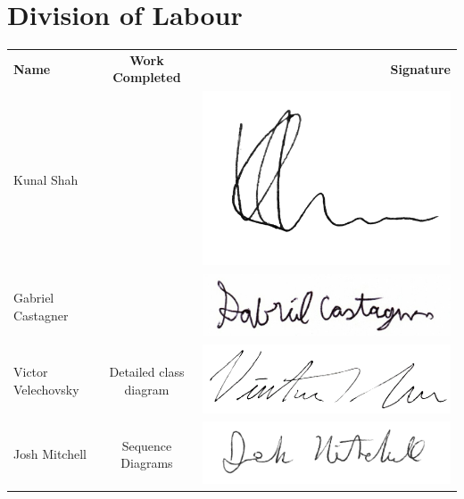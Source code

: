 \documentclass[]{article}
\begin{document}
\section{Division of Labour}
\label{sec:division_of_labour}
\begin{tabular}{l c r}
	\textbf{Name} & \textbf{Work Completed} & \textbf{Signature} \\
	
	Kunal Shah &  & 
	\includegraphics[scale=0.2]{../Resources/Signature/Kunal-Sig.png} \\
	
	Gabriel Castagner &  &
	\includegraphics[scale=0.2]{../Resources/Signature/Gabe-Sig.png} \\
	
	Victor Velechovsky & Detailed class diagram & 
	\includegraphics[scale=0.3]{../Resources/Signature/Vic-Sig.png} \\
	
	Josh Mitchell & Sequence Diagrams & 
	\includegraphics[scale=0.2]{../Resources/Signature/Josh-Sig.png} \\
\end{tabular}
\end{document}
